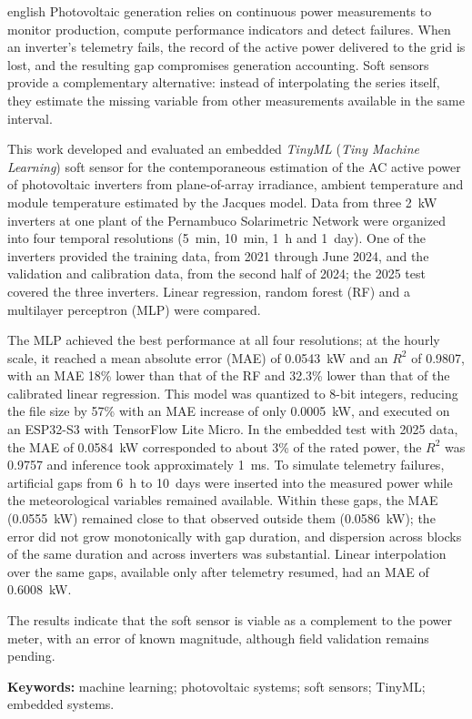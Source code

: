 \begin{resumo}[Abstract]
\begin{otherlanguage*}{english}
Photovoltaic generation relies on continuous power measurements to monitor
production, compute performance indicators and detect failures. When an inverter's
telemetry fails, the record of the active power delivered to the grid is lost, and
the resulting gap compromises generation accounting. Soft sensors provide a
complementary alternative: instead of interpolating the series itself, they
estimate the missing variable from other measurements available in the same
interval.

This work developed and evaluated an embedded \textit{TinyML} (\textit{Tiny
Machine Learning}) soft sensor for the contemporaneous estimation of the AC active
power of photovoltaic inverters from plane-of-array irradiance, ambient
temperature and module temperature estimated by the Jacques model. Data from three
2~kW inverters at one plant of the Pernambuco Solarimetric Network were organized
into four temporal resolutions (5~min, 10~min, 1~h and 1~day). One of the
inverters provided the training data, from 2021 through June 2024, and the
validation and calibration data, from the second half of 2024; the 2025 test
covered the three inverters. Linear regression, random forest (RF) and a multilayer perceptron
(MLP) were compared.

The MLP achieved the best performance at all four resolutions; at the hourly
scale, it reached a mean absolute error (MAE) of 0.0543~kW and an $R^2$ of 0.9807,
with an MAE 18\% lower than that of the RF and 32.3\% lower than that of the
calibrated linear regression. This model was quantized to 8-bit integers,
reducing the file size by 57\% with an MAE increase of only 0.0005~kW, and
executed on an ESP32-S3 with TensorFlow Lite Micro. In the embedded test with 2025
data, the MAE of 0.0584~kW corresponded to about 3\% of the rated power, the
$R^2$ was 0.9757 and inference took approximately 1~ms. To simulate telemetry
failures, artificial gaps from 6~h to 10~days were inserted into the measured
power while the meteorological variables remained available. Within these gaps,
the MAE (0.0555~kW) remained close to that observed outside them (0.0586~kW); the
error did not grow monotonically with gap duration, and dispersion across blocks
of the same duration and across inverters was substantial. Linear interpolation
over the same gaps, available only after telemetry resumed, had an MAE of
0.6008~kW.

The results indicate that the soft sensor is viable as a complement to the power
meter, with an error of known magnitude, although field validation remains
pending.

\noindent\textbf{Keywords:} machine learning; photovoltaic systems; soft sensors;
TinyML; embedded systems.
\end{otherlanguage*}
\end{resumo}
